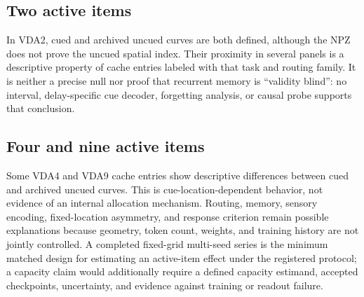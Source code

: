 \documentclass[11pt,a4paper]{article}
\begin{document}
\subsection{Two active items}
In VDA2, cued and archived uncued curves are both defined, although the NPZ does not prove the uncued spatial index. Their proximity in several panels is a descriptive property of cache entries labeled with that task and routing family. It is neither a precise null nor proof that recurrent memory is ``validity blind'': no interval, delay-specific cue decoder, forgetting analysis, or causal probe supports that conclusion.

\subsection{Four and nine active items}
Some VDA4 and VDA9 cache entries show descriptive differences between cued and archived uncued curves. This is cue-location-dependent behavior, not evidence of an internal allocation mechanism. Routing, memory, sensory encoding, fixed-location asymmetry, and response criterion remain possible explanations because geometry, token count, weights, and training history are not jointly controlled. A completed fixed-grid multi-seed series is the minimum matched design for estimating an active-item effect under the registered protocol; a capacity claim would additionally require a defined capacity estimand, accepted checkpoints, uncertainty, and evidence against training or readout failure.
\end{document}

